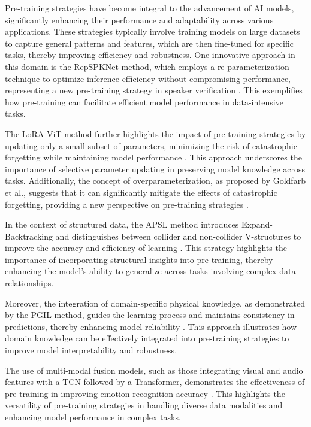 Pre-training strategies have become integral to the advancement of AI models, significantly enhancing their performance and adaptability across various applications. These strategies typically involve training models on large datasets to capture general patterns and features, which are then fine-tuned for specific tasks, thereby improving efficiency and robustness. One innovative approach in this domain is the RepSPKNet method, which employs a re-parameterization technique to optimize inference efficiency without compromising performance, representing a new pre-training strategy in speaker verification \cite{ma2021repworksspeakerverification}. This exemplifies how pre-training can facilitate efficient model performance in data-intensive tasks.



The LoRA-ViT method further highlights the impact of pre-training strategies by updating only a small subset of parameters, minimizing the risk of catastrophic forgetting while maintaining model performance \cite{chitale2023taskarithmeticloracontinual}. This approach underscores the importance of selective parameter updating in preserving model knowledge across tasks. Additionally, the concept of overparameterization, as proposed by Goldfarb et al., suggests that it can significantly mitigate the effects of catastrophic forgetting, providing a new perspective on pre-training strategies \cite{goldfarb2022analysiscatastrophicforgettingrandom}.



In the context of structured data, the APSL method introduces Expand-Backtracking and distinguishes between collider and non-collider V-structures to improve the accuracy and efficiency of learning \cite{ling2021bayesiannetworkstructurelearning}. This strategy highlights the importance of incorporating structural insights into pre-training, thereby enhancing the model's ability to generalize across tasks involving complex data relationships.



Moreover, the integration of domain-specific physical knowledge, as demonstrated by the PGIL method, guides the learning process and maintains consistency in predictions, thereby enhancing model reliability \cite{huang2022physicallyexplainablecnnsar}. This approach illustrates how domain knowledge can be effectively integrated into pre-training strategies to improve model interpretability and robustness.



The use of multi-modal fusion models, such as those integrating visual and audio features with a TCN followed by a Transformer, demonstrates the effectiveness of pre-training in improving emotion recognition accuracy \cite{zhou2023leveragingtcntransformereffective}. This highlights the versatility of pre-training strategies in handling diverse data modalities and enhancing model performance in complex tasks.



